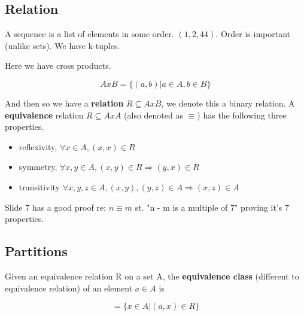 \documentclass{article}
\begin{document}
\subsection{Relation}

A sequence is a list of elements in some order. $(1, 2, 44)$. Order is important (unlike sets). We have k-tuples.

Here we have cross products.

\begin{equation}
	A x B = \{(a,b) | a \in A, b \in B\}
\end{equation}

And then so we have a \textbf{relation} $R \subseteq A x B$, we denote this a binary relation. A \textbf{equivalence} relation $R \subseteq A x A$ (also denoted as $\equiv$) has the following three properties.

\begin{itemize}
	\item reflexivity, $\forall x \in A, (x,x) \in R$
	\item symmetry, $\forall x,y \in A, (x,y) \in R \Rightarrow (y,x) \in R$
	\item transitivity $\forall x,y,z \in A, (x,y), (y,z) \in A \Rightarrow (x,z) \in A$
\end{itemize}

Slide 7 has a good proof re: $n \equiv m$ st. "n - m is a multiple of 7" proving it's 7 properties.

\subsection{Partitions}

Given an equivalence relation R on a set A, the \textbf{equivalence class} (different to equivalence relation) of an element $a \in A$ is

\begin{equation}
	[a] = \{x\in A|(a,x)\in R\}
\end{equation}
\end{document}
